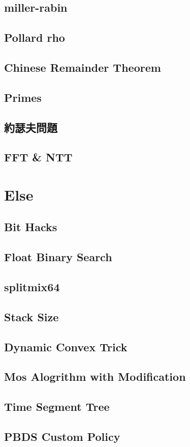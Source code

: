 \subsection{miller-rabin}

\subsection{Pollard rho}

\subsection{Chinese Remainder Theorem}

\subsection{Primes}

\subsection{約瑟夫問題}

\subsection{FFT \& NTT}


\section{Else}
\subsection{Bit Hacks}

\subsection{Float Binary Search}

\subsection{splitmix64}

\subsection{Stack Size}

\subsection{Dynamic Convex Trick}

\subsection{Mos Alogrithm with Modification}

\subsection{Time Segment Tree}

\subsection{PBDS Custom Policy}

